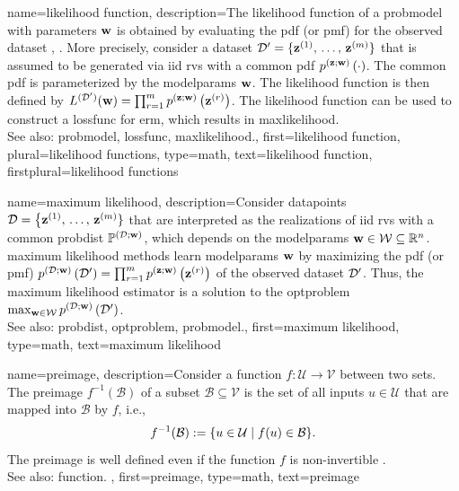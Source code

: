 {name={likelihood function},
	description={The likelihood \gls{function} of a \gls{probmodel} 
		with \glspl{parameter} ${\bf w}$ is obtained by evaluating the 
		\gls{pdf} (or \gls{pmf}) for the observed \gls{dataset} \cite{LC}, \cite{CasellaBergerStatInf}. 
		More precisely, consider a \gls{dataset} 
		$\mathcal{D}' = \{{\bf z}^{(1)}, \,\ldots, \,{\bf z}^{(m)}\}$ 
		that is assumed to be generated via \gls{iid} 
		\glspl{rv} with a common \gls{pdf} $p^{({\bf z};{\bf w})}\left(\cdot\right)$. 
		The common \gls{pdf} is parameterized by the \glspl{modelparam} ${\bf w}$. 
		The likelihood \gls{function} is then defined by 
		$L^{(\mathcal{D}')}({\bf w}) = \prod_{r=1}^{m} p^{({\bf z};{\bf w})}\left({\bf z}^{(r)}\right)$.
		The likelihood \gls{function} can be used to construct a \gls{lossfunc} 
		for \gls{erm}, which results in \gls{maxlikelihood}. 
		\\
		See also: \gls{probmodel}, \gls{lossfunc}, \gls{maxlikelihood}.},
	first={likelihood function},
	plural={likelihood functions},
	type=math,
	text={likelihood function},
	firstplural={likelihood functions}
}

{name={maximum likelihood}, 
	description={Consider \glspl{datapoint} 
		$\mathcal{D}=\big\{ {\bf z}^{(1)}, \,\ldots, \,{\bf z}^{(m)} \}$ 
		that are interpreted as the \glspl{realization} of \gls{iid} \glspl{rv} 
		with a common \gls{probdist} $\mathbb{P}^{(\mathcal{D};{\bf w})}$, which depends 
		on the \glspl{modelparam} ${\bf w} \in \mathcal{W} \subseteq \mathbb{R}^{n}$. 
		\Gls{maximum} likelihood methods learn \glspl{modelparam} ${\bf w}$ by maximizing 
		the \gls{pdf} (or \gls{pmf}) 
		$p^{(\mathcal{D};{\bf w})}\left(\mathcal{D}'\right) = \prod_{r=1}^{m} 
		p^{({\bf z};{\bf w})}\left({\bf z}^{(r)}\right)$ 
		of the observed \gls{dataset} $\mathcal{D}'$. Thus, the \gls{maximum} 
		likelihood \gls{estimator} is a solution to the \gls{optproblem} 
		$\max_{{\bf w} \in \mathcal{W}} p^{(\mathcal{D};{\bf w})}\left(\mathcal{D}'\right)$.
				\\
		See also: \gls{probdist}, \gls{optproblem}, \gls{probmodel}.},
	first={maximum likelihood},
	type=math, 
	text={maximum likelihood}
}

{name={preimage}, 
	description={Consider a \gls{function} $f\colon \mathcal{U} \rightarrow \mathcal{V}$ 
		between two sets. The preimage $f^{-1}(\mathcal{B})$ of a subset $\mathcal{B} \subseteq \mathcal{V}$ is the set 
		of all inputs $u \in \mathcal{U}$ that are mapped into $\mathcal{B}$ by $f$, i.e.,
		\[
		f^{-1}(\mathcal{B}) := \{ u \in \mathcal{U} \mid f(u) \in \mathcal{B} \}.
		\]
		The preimage is well defined even if the \gls{function} $f$ is non-invertible \cite{RudinBookPrinciplesMatheAnalysis}.
		\\
		See also: \gls{function}. },
	first={preimage},
	type=math, 
	text={preimage}
}

